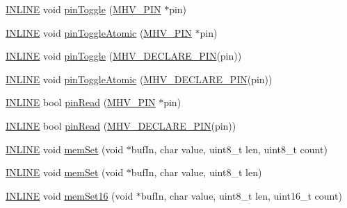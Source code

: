 \begin{DoxyCompactItemize}
\item 
\hyperlink{io_8h_a2eb6f9e0395b47b8d5e3eeae4fe0c116}{I\-N\-L\-I\-N\-E} void \hyperlink{namespacemhvlib_ae8c63b97b099ba07df137fc112a6cf78}{pin\-Toggle} (\hyperlink{namespacemhvlib_a3fc44352ee2826fe480452ba1acd5de7}{M\-H\-V\-\_\-\-P\-I\-N} $\ast$pin)
\item 
\hyperlink{io_8h_a2eb6f9e0395b47b8d5e3eeae4fe0c116}{I\-N\-L\-I\-N\-E} void \hyperlink{namespacemhvlib_adf5a1cac133feb6570aa4763af2f9c80}{pin\-Toggle\-Atomic} (\hyperlink{namespacemhvlib_a3fc44352ee2826fe480452ba1acd5de7}{M\-H\-V\-\_\-\-P\-I\-N} $\ast$pin)
\item 
\hyperlink{io_8h_a2eb6f9e0395b47b8d5e3eeae4fe0c116}{I\-N\-L\-I\-N\-E} void \hyperlink{namespacemhvlib_a667a0b3c95712f6ccff67383f8d2f61f}{pin\-Toggle} (\hyperlink{io_8h_afb172d17be3890bb07e5ceec5a014b91}{M\-H\-V\-\_\-\-D\-E\-C\-L\-A\-R\-E\-\_\-\-P\-I\-N}(pin))
\item 
\hyperlink{io_8h_a2eb6f9e0395b47b8d5e3eeae4fe0c116}{I\-N\-L\-I\-N\-E} void \hyperlink{namespacemhvlib_a86dc483eef7718ff9f130373389a6465}{pin\-Toggle\-Atomic} (\hyperlink{io_8h_afb172d17be3890bb07e5ceec5a014b91}{M\-H\-V\-\_\-\-D\-E\-C\-L\-A\-R\-E\-\_\-\-P\-I\-N}(pin))
\item 
\hyperlink{io_8h_a2eb6f9e0395b47b8d5e3eeae4fe0c116}{I\-N\-L\-I\-N\-E} bool \hyperlink{namespacemhvlib_a2e96b6fec41888af90bbe3d97609a9bf}{pin\-Read} (\hyperlink{namespacemhvlib_a3fc44352ee2826fe480452ba1acd5de7}{M\-H\-V\-\_\-\-P\-I\-N} $\ast$pin)
\item 
\hyperlink{io_8h_a2eb6f9e0395b47b8d5e3eeae4fe0c116}{I\-N\-L\-I\-N\-E} bool \hyperlink{namespacemhvlib_aa534678c25bea838ee6c812eb6c237e9}{pin\-Read} (\hyperlink{io_8h_afb172d17be3890bb07e5ceec5a014b91}{M\-H\-V\-\_\-\-D\-E\-C\-L\-A\-R\-E\-\_\-\-P\-I\-N}(pin))
\item 
\hyperlink{io_8h_a2eb6f9e0395b47b8d5e3eeae4fe0c116}{I\-N\-L\-I\-N\-E} void \hyperlink{namespacemhvlib_ae4f3192ceb9e2000efd2023f4cbd2a7a}{mem\-Set} (void $\ast$buf\-In, char value, uint8\-\_\-t len, uint8\-\_\-t count)
\item 
\hyperlink{io_8h_a2eb6f9e0395b47b8d5e3eeae4fe0c116}{I\-N\-L\-I\-N\-E} void \hyperlink{namespacemhvlib_ab74e81ed6209670365343a874878f457}{mem\-Set} (void $\ast$buf\-In, char value, uint8\-\_\-t len)
\item 
\hyperlink{io_8h_a2eb6f9e0395b47b8d5e3eeae4fe0c116}{I\-N\-L\-I\-N\-E} void \hyperlink{namespacemhvlib_aeecbcaf76266788cee06acacfa86b4cc}{mem\-Set16} (void $\ast$buf\-In, char value, uint8\-\_\-t len, uint16\-\_\-t count)
\item 

\end{DoxyCompactItemize}
